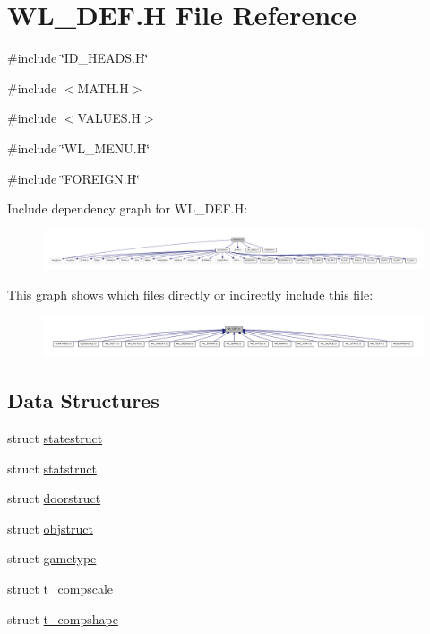\hypertarget{WL__DEF_8H}{
\section{WL\_\-DEF.H File Reference}
\label{WL__DEF_8H}
}
{\ttfamily \#include \char`\"{}ID\_\-HEADS.H\char`\"{}}\par
{\ttfamily \#include $<$MATH.H$>$}\par
{\ttfamily \#include $<$VALUES.H$>$}\par
{\ttfamily \#include \char`\"{}WL\_\-MENU.H\char`\"{}}\par
{\ttfamily \#include \char`\"{}FOREIGN.H\char`\"{}}\par
Include dependency graph for WL\_\-DEF.H:
\nopagebreak
\begin{figure}[H]
\begin{center}
\leavevmode
\includegraphics[width=400pt]{WL__DEF_8H__incl}
\end{center}
\end{figure}
This graph shows which files directly or indirectly include this file:
\nopagebreak
\begin{figure}[H]
\begin{center}
\leavevmode
\includegraphics[width=400pt]{WL__DEF_8H__dep__incl}
\end{center}
\end{figure}
\subsection*{Data Structures}
\begin{DoxyCompactItemize}
\item 
struct \hyperlink{structstatestruct}{statestruct}
\item 
struct \hyperlink{structstatstruct}{statstruct}
\item 
struct \hyperlink{structdoorstruct}{doorstruct}
\item 
struct \hyperlink{structobjstruct}{objstruct}
\item 
struct \hyperlink{structgametype}{gametype}
\item 
struct \hyperlink{structt__compscale}{t\_\-compscale}
\item 
struct \hyperlink{structt__compshape}{t\_\-compshape}
\end{DoxyCompactItemize}

